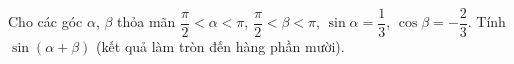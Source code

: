 \begin{ex}
Cho các góc $\alpha$, $\beta$ thỏa mãn $\dfrac{\pi}{2}<\alpha<\pi$, $\dfrac{\pi}{2}<\beta<\pi$, $\sin\alpha=\dfrac13$, $\cos\beta=-\dfrac23$. Tính $\sin(\alpha+\beta)$ (kết quả làm tròn đến hàng phần mười).
\end{ex}
